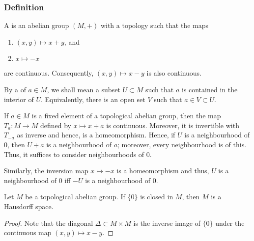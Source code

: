 \subsubsection{Definition}

\begin{defn}
	A  is an abelian group $(M, +)$ with a topology such that the maps
	\begin{enumerate}
		\item $(x, y) \mapsto x + y$, and
		\item $x \mapsto -x$
	\end{enumerate}
	are continuous. Consequently, $(x, y) \mapsto x - y$ is also continuous.
\end{defn}

By a  of $a \in M$, we shall mean a subset $U \subset M$ such that $a$ is contained in the interior of $U$. Equivalently, there is an open set $V$ such that $a \in V \subset U$.

If $a \in M$ is a fixed element of a topological abelian group, then the map $T_{a} : M \to M$ defined by $x \mapsto x + a$ is continuous. Moreover, it is invertible with $T_{-a}$ as inverse and hence, is a homeomorphism. Hence, if $U$ is a neighbourhood of $0$, then $U + a$ is a neighbourhood of $a$; moreover, every neighbourhood is of this. Thus, it suffices to consider neighbourhoods of $0$.

Similarly, the inversion map $x \mapsto -x$ is a homeomorphism and thus, $U$ is a neighbourhood of $0$ iff $-U$ is a neighbourhood of $0$.

\begin{lem}
	Let $M$ be a topological abelian group. If $\{0\}$ is closed in $M$, then $M$ is a Hausdorff space.
\end{lem}
\begin{proof} 
	Note that the diagonal $\Delta \subset M \times M$ is the inverse image of $\{0\}$ under the continuous map $(x, y) \mapsto x - y$. 
\end{proof}

